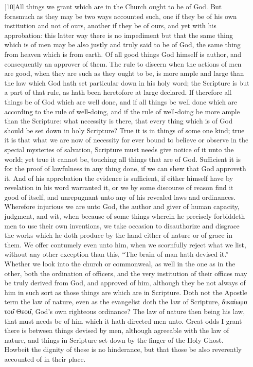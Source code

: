 [10]All things we grant which are in the Church ought to be of God. But forasmuch as they may be two ways accounted such, one if they be of his own institution and not of ours, another if they be of ours, and yet with his approbation: this latter way there is no impediment but that the same thing which is of men may be also justly and truly said to be of God, the same thing from heaven which is from earth. Of all good things God himself is author, and consequently an approver of them. The rule to discern when the actions of men are good, when they are such as they ought to be, is more ample and large than the law which God hath set particular down in his holy word; the Scripture is but a part of that rule, as hath been heretofore at  large declared. If therefore all things be of God which are well done, and if all things be well done which are according to the rule of well-doing, and if the rule of well-doing be more ample than the Scripture: what necessity is there, that every thing which is of God should be set down in holy Scripture? True it is in things of some one kind; true it is that what we are now of necessity for ever bound to believe or observe in the special mysteries of salvation, Scripture must needs give notice of it unto the world; yet true it cannot be, touching all things that are of God. Sufficient it is for the proof of lawfulness in any thing done, if we can shew that God approveth it. And of his approbation the evidence is sufficient, if either himself have by revelation in his word warranted it, or we by some discourse of reason find it good of itself, and unrepugnant unto any of his revealed laws and ordinances. Wherefore injurious we are unto God, the author and giver of human capacity, judgment, and wit, when because of some things wherein he precisely forbiddeth men to use their own inventions, we take occasion to disauthorize and disgrace the works which he doth produce by the hand either of nature or of grace in them. We offer contumely even unto him, when we scornfully reject what we list, without any other exception than this, “The brain of man hath devised it.” Whether we look into the church or commonweal, as well in the one as in the other, both the ordination of officers, and the very institution of their offices may be truly derived from God, and approved of him, although they be not always of him in such sort as those things are which are in Scripture. Doth not the Apostle term the law of nature, even as the evangelist doth the law of Scripture, δικαίωμα του̑ Θεου̑, God’s own righteous ordinance? The law of nature then being his law, that must needs be of him which it hath directed men unto. Great odds I grant there is between things devised by men, although agreeable with the law of nature, and things in Scripture set down by the finger of the Holy Ghost. Howbeit the dignity of these is no hinderance, but that those be also reverently accounted of in their place.


